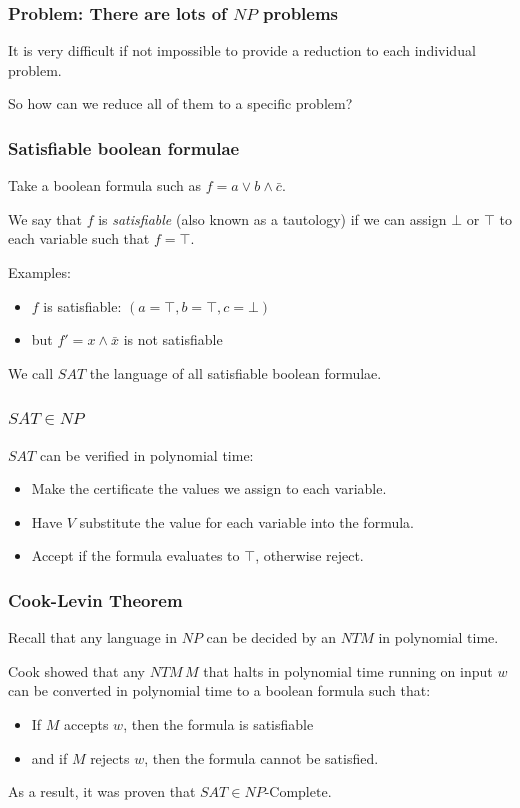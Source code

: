 \documentclass[aspectratio=169]{beamer}
\begin{document}
\begin{frame}
\frametitle{Problem: There are lots of $NP$ problems}
It is very difficult if not impossible to provide a reduction to each individual problem.

So how can we reduce all of them to a specific problem?
\end{frame}

\begin{frame}
\frametitle{Satisfiable boolean formulae}
Take a boolean formula such as $f = a \vee b \wedge \bar{c}$.

We say that $f$ is {\em satisfiable} (also known as a tautology) if we can assign $\bot$ or $\top$ to each variable such that $f = \top$.

Examples:
\begin{itemize}
    \item $f$ is satisfiable: $(a = \top, b = \top, c =  \bot)$
    \item but $f' = x \wedge \bar{x}$ is not satisfiable
\end{itemize}

We call $SAT$ the language of all satisfiable boolean formulae.
\end{frame}

\begin{frame}
\frametitle{$SAT \in NP$}
$SAT$ can be verified in polynomial time:

\begin{itemize}
    \item<1-> Make the certificate the values we assign to each variable.
    \item<2-> Have $V$ substitute the value for each variable into the formula.
    \item<3-> Accept if the formula evaluates to $\top$, otherwise reject.
\end{itemize}
\end{frame}

\begin{frame}
\frametitle{Cook-Levin Theorem}
Recall that any language in $NP$ can be decided by an $NTM$ in polynomial time.

Cook showed that any $NTM\, M$ that halts in polynomial time running on input $w$ can be converted in polynomial time to a boolean formula such that:

\begin{itemize}
    \item If $M$ accepts $w$, then the formula is satisfiable
    \item and if $M$ rejects $w$, then the formula cannot be satisfied.
\end{itemize}

As a result, it was proven that $SAT \in NP\text{-Complete}$.
\end{frame}
\end{document}
